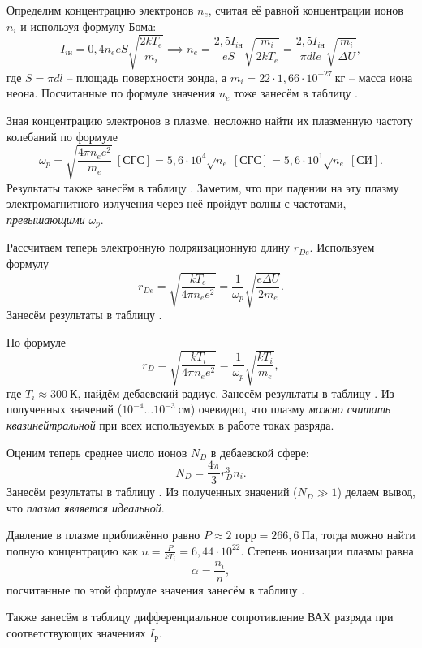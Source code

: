 \documentclass[a4paper,10pt]{article}
\begin{document}
Определим концентрацию электронов $n_e$, считая её равной концентрации ионов $n_i$ и используя формулу Бома:\[I_{i\text{н}}=0,4n_eeS\sqrt{\frac{2kT_e}{m_i}}\implies n_e=\frac{2,5I_{i\text{н}}}{eS}\sqrt{\frac{m_i}{2kT_e}}=\frac{2,5I_{i\text{н}}}{\pi dle}\sqrt{\frac{m_i}{\Delta U}},\]где $S=\pi dl$ -- площадь поверхности зонда, а $m_i=22\cdot1,66\cdot10^{-27}~\text{кг}$ -- масса иона неона. Посчитанные по формуле значения $n_e$ тоже занесём в таблицу .

Зная концентрацию электронов в плазме, несложно найти их плазменную частоту колебаний по формуле\[\omega_p=\sqrt{\frac{4\pi n_ee^2}{m_e}}\ \left[\text{СГС}\right]=5,6\cdot10^4\sqrt{n_e}\ \left[\text{СГС}\right]=5,6\cdot10^1\sqrt{n_e}\ \left[\text{СИ}\right].\]Результаты также занесём в таблицу . Заметим, что при падении на эту плазму электромагнитного излучения через неё пройдут волны с частотами, \textit{превышающими} $\omega_p$.

Рассчитаем теперь электронную полряизационную длину $r_{De}$. Используем формулу\[r_{De}=\sqrt{\frac{kT_e}{4\pi n_ee^2}}=\frac{1}{\omega_p}\sqrt{\frac{e\Delta U}{2m_e}}.\]Занесём результаты в таблицу .

По формуле\[r_{D}=\sqrt{\frac{kT_i}{4\pi n_ee^2}}=\frac{1}{\omega_p}\sqrt{\frac{kT_i}{m_e}},\]где $T_i\approx300~\text{К}$, найдём дебаевский радиус. Занесём результаты в таблицу . Из полученных значений ($10^{-4}\ldots10^{-3}~\text{см}$) очевидно, что плазму \textit{можно считать квазинейтральной} при всех используемых в работе токах разряда.

Оценим теперь среднее число ионов $N_D$ в дебаевской сфере:\[N_D=\frac{4\pi}{3}r_D^3n_i.\]Занесём результаты в таблицу . Из полученных значений ($N_D\gg1$) делаем вывод, что \textit{плазма является идеальной}.

Давление в плазме приближённо равно $P\approx2~\text{торр}=266,6~\text{Па}$, тогда можно найти полную концентрацию как $n=\frac{P}{kT_i}=6,44\cdot10^{22}$. Степень ионизации плазмы равна\[\alpha=\frac{n_i}{n},\]посчитанные по этой формуле значения занесём в таблицу .

Также занесём в таблицу дифференциальное сопротивление ВАХ разряда при соответствующих значениях $I_{\text{р}}$.
\end{document}
